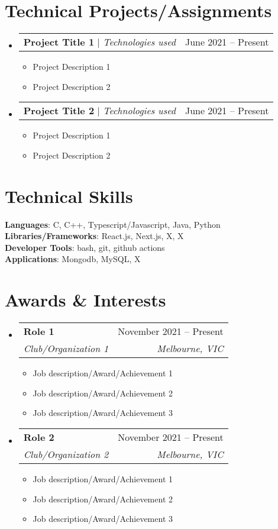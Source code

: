 \documentclass[letterpaper,11pt]{article}
\makeatletter
\newcommand{\resumeItem}[1]{
  \item\small{
    {#1 \vspace{-2pt}}
  }
}
\newcommand{\resumeSubheading}[4]{
  \vspace{-2pt}\item
    \begin{tabular*}{0.97\textwidth}[t]{l@{\extracolsep{\fill}}r}
      \textbf{#1} & #2 \\
      \textit{\small#3} & \textit{\small #4} \\
    \end{tabular*}\vspace{-7pt}
}
\newcommand{\resumeProjectHeading}[2]{
    \item
    \begin{tabular*}{0.97\textwidth}{l@{\extracolsep{\fill}}r}
      \small#1 & #2 \\
    \end{tabular*}\vspace{-7pt}
}
\newcommand{\resumeSubHeadingListStart}{\begin{itemize}[leftmargin=0.15in, label={}]}
\newcommand{\resumeSubHeadingListEnd}{\end{itemize}}
\newcommand{\resumeItemListStart}{\begin{itemize}}
\newcommand{\resumeItemListEnd}{\end{itemize}\vspace{-5pt}}
\makeatother
\begin{document}
\section{Technical Projects/Assignments}

\resumeSubHeadingListStart
\resumeProjectHeading
{\textbf{Project Title 1} $|$ \emph{Technologies used}}{June 2021 -- Present}
\resumeItemListStart
\resumeItem{Project Description 1}
\resumeItem{Project Description 2}
\resumeItemListEnd

\resumeProjectHeading
{\textbf{Project Title 2} $|$ \emph{Technologies used}}{June 2021 -- Present}
\resumeItemListStart
\resumeItem{Project Description 1}
\resumeItem{Project Description 2}
\resumeItemListEnd


\resumeSubHeadingListEnd


\section{Technical Skills}
\begin{itemize}[leftmargin=0.15in, label={}]
  \small{\item{
        \textbf{Languages}{: C, C++, Typescript/Javascript, Java, Python} \\
        \textbf{Libraries/Frameworks}{: React.js, Next.js, X, X} \\
        \textbf{Developer Tools}{: bash, git, github actions} \\
        \textbf{Applications}{: Mongodb, MySQL, X}
        }}
\end{itemize}


\section{Awards \& Interests}
\resumeSubHeadingListStart

\resumeSubheading
{Role 1}{November 2021 – Present}
{Club/Organization 1}{Melbourne, VIC}
\resumeItemListStart
\resumeItem{Job description/Award/Achievement 1}
\resumeItem{Job description/Award/Achievement 2}
\resumeItem{Job description/Award/Achievement 3}
\resumeItemListEnd

\resumeSubheading
{Role 2}{November 2021 – Present}
{Club/Organization 2}{Melbourne, VIC}
\resumeItemListStart
\resumeItem{Job description/Award/Achievement 1}
\resumeItem{Job description/Award/Achievement 2}
\resumeItem{Job description/Award/Achievement 3}
\resumeItemListEnd

\resumeSubHeadingListEnd
\end{document}

